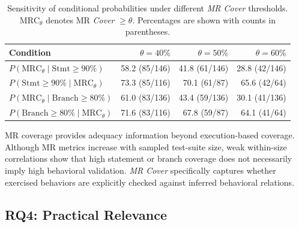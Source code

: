 \begin{table}[h]
\centering
\caption{Sensitivity of conditional probabilities under different \textit{MR Cover} thresholds. $\mathrm{MRC}_{\theta}$ denotes MR \textit{Cover} $\geq \theta$. Percentages are shown with counts in parentheses.}
\label{tab:rq3-conditional}
\setlength{\tabcolsep}{1.5pt}
\renewcommand{\arraystretch}{1.3}
\begin{tabular}{lrrr}
\toprule
\textbf{Condition} & \textbf{$\theta=40\%$} & \textbf{$\theta=50\%$} & \textbf{$\theta=60\%$} \\
\midrule
$P(\mathrm{MRC}_{\theta} \mid \mathrm{Stmt}\geq90\%)$
& 58.2 {\footnotesize (85/146)}
& 41.8 {\footnotesize (61/146)}
& 28.8 {\footnotesize (42/146)} \\

$P(\mathrm{Stmt}\geq90\% \mid \mathrm{MRC}_{\theta})$
& 73.3 {\footnotesize (85/116)}
& 70.1 {\footnotesize (61/87)}
& 65.6 {\footnotesize (42/64)} \\

$P(\mathrm{MRC}_{\theta} \mid \mathrm{Branch}\geq80\%)$
& 61.0 {\footnotesize (83/136)}
& 43.4 {\footnotesize (59/136)}
& 30.1 {\footnotesize (41/136)} \\

$P(\mathrm{Branch}\geq80\% \mid \mathrm{MRC}_{\theta})$
& 71.6 {\footnotesize (83/116)}
& 67.8 {\footnotesize (59/87)}
& 64.1 {\footnotesize (41/64)} \\
\bottomrule
\end{tabular}
\end{table}


\begin{tcolorbox}[colback=gray!5, colframe=gray!30, title=\textbf{\small Answer to RQ3}, coltitle=black!90, left=2.5pt, top=3pt, bottom=3pt, right=2.5pt, boxsep=1.8pt]
MR coverage provides adequacy information beyond execution-based coverage. Although MR metrics increase with sampled test-suite size, weak within-size correlations show that high statement or branch coverage does not necessarily imply high behavioral validation. \textit{MR Cover} specifically captures whether exercised behaviors are explicitly checked against inferred behavioral relations.
\end{tcolorbox}



\subsection{RQ4: Practical Relevance}\label{sec:rq4-results}

